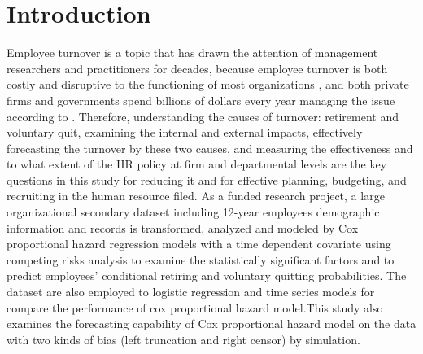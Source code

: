 \documentclass[12pt,letterpaper]{article}
\title{}
\author{Xiaojuan Zhu}
\begin{document}
\maketitle

\begin{abstract}


\end{abstract}

\section{Introduction}
Employee turnover is a topic that has drawn the attention of management researchers and practitioners for decades, because  employee turnover is both costly and disruptive to the functioning of most organizations \citep{staw1980, mueller1989,kacmar2006}, and both private firms and governments spend billions of dollars every year managing the issue according to \citet{leonard2001}. Therefore, understanding the causes of turnover: retirement and voluntary quit, examining the internal and external impacts, effectively forecasting the turnover by these two causes, and measuring the effectiveness and to what extent of the HR policy at firm and departmental levels are the key questions in this study for reducing it and for effective planning, budgeting, and recruiting in the human resource filed. As a funded research project, a large organizational secondary dataset including 12-year employees demographic information and records is transformed, analyzed and modeled by Cox proportional hazard regression models with a time dependent covariate using competing risks analysis to examine the statistically significant factors and to predict employees' conditional retiring and voluntary quitting probabilities. The dataset are also employed to logistic regression and time series models for compare the performance of cox proportional hazard model.This study also examines the forecasting capability of Cox proportional hazard model on the data with two kinds of bias (left truncation and right censor) by simulation.      
\end{document}
